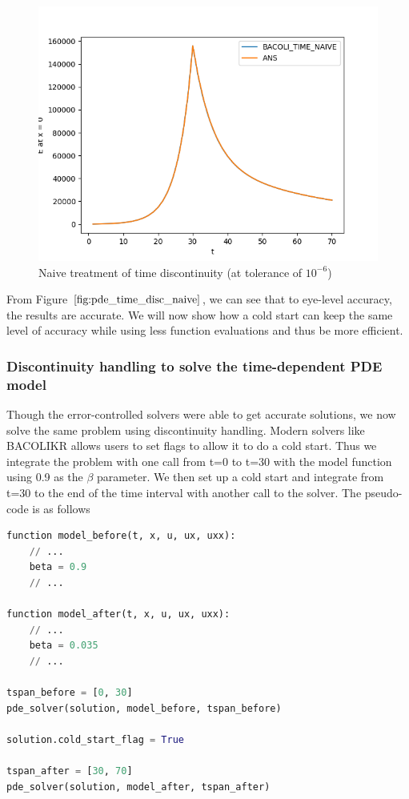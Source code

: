 \documentclass{article}
\begin{document}
\begin{figure}[H]
\centering
\includegraphics[width=0.7\linewidth]{./figures/pde_time_disc_naive}
\caption{Naive treatment of time discontinuity (at tolerance of $10^{-6}$)}
\label{fig:pde_time_disc_naive}
\end{figure}

From Figure $\ref{fig:pde_time_disc_naive}$, we can see that to eye-level accuracy, the results are accurate. We will now show how a cold start can keep the same level of accuracy while using less function evaluations and thus be more efficient.

\subsubsection{Discontinuity handling to solve the time-dependent PDE model}
\label{subsubsection:pde_time_disc_hand}
Though the error-controlled solvers were able to get accurate solutions, we now solve the same problem using discontinuity handling. Modern solvers like BACOLIKR allows users to set flags to allow it to do a cold start. Thus we integrate the problem with one call from t=0 to t=30 with the model function using 0.9 as the $\beta$ parameter. We then set up a cold start and integrate from t=30 to the end of the time interval with another call to the solver. The pseudo-code is as follows

\begin{minipage}{\linewidth}
\begin{lstlisting}[language=Python]
function model_before(t, x, u, ux, uxx):
    // ...
    beta = 0.9
    // ...
    
function model_after(t, x, u, ux, uxx):
    // ...
    beta = 0.035
    // ...
 
tspan_before = [0, 30]
pde_solver(solution, model_before, tspan_before)

solution.cold_start_flag = True

tspan_after = [30, 70]
pde_solver(solution, model_after, tspan_after)

\end{lstlisting}
\end{minipage}
\end{document}
